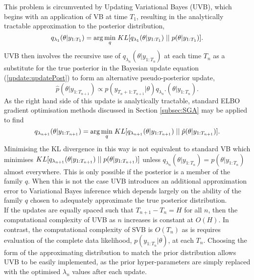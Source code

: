 \documentclass[12pt,a4paper]{article}\usepackage[]{graphicx}\usepackage[]{color}
\begin{document}
This problem is circumvented by Updating Variational Bayes (UVB), which begins with an application of VB at time $T_1$, resulting in the analytically tractable approximation to the posterior distribution,
\begin{equation}
\label{UVB:Time1}
q_{\lambda_1}(\theta | y_{1:T_1}) = \arg \underset{q}{\min} \hspace{1mm} KL[q_{\lambda_1} (\theta | y_{1:T_1}) \hspace{.1cm}||\hspace{.1cm}p(\theta | y_{1:T_1})].
\end{equation}
UVB then involves the recursive use of $q_{\lambda_n}(\theta | y_{1:T_n})$ at each time $T_n$ as a substitute for the true posterior in the Bayesian update equation (\ref{update:updatePost}) to form an alternative pseudo-posterior update,
\begin{equation}
\label{UVB:pHatPosterior}
\hat{p}(\theta |  y_{1:T_{n+1}}) \propto p(y_{T_{n}+1:T_{n+1}} | \theta)q_{\lambda_{n}}.(\theta | y_{1:T_{n}}).
\end{equation}
As the right hand side of this update is analytically tractable, standard ELBO gradient optimisation methods discussed in Section \ref{subsec:SGA} may be applied to find  
\begin{equation}
\label{UVB:TimeNp1}
q_{\lambda_{n+1}}(\theta | y_{1:T_{n+1}}) = \arg \underset{q}{\min} \hspace{1mm} KL[q_{\lambda_{n+1}} (\theta | y_{1:T_{n+1}}) \hspace{.1cm}||\hspace{.1cm}\hat{p}(\theta | y_{1:T_{n+1}})].
\end{equation}
Minimising the KL divergence in this way is not equivalent to standard VB which minimises $KL[q_{\lambda_{n+1}} (\theta | y_{1:T_{n+1}}) \hspace{.1cm}||\hspace{.1cm}p(\theta | y_{1:T_{n+1}})]$ unless $q_{\lambda_{n}}(\theta |  y_{1:T_{n}}) = p(\theta |  y_{1:T_{n}})$ almost everywhere. This is only possible if the posterior is a member of the family $q$. When this is not the case UVB introduces an additional approximation error to Variational Bayes inference which depends largely on the ability of the family $q$ chosen to adequately approximate the true posterior distribution.
\\

If the updates are equally spaced such that $T_{n+1} - T_{n} = H$ for all $n$, then the computational complexity of UVB as $n$ increases is constant at $O(H)$. In contrast, the computational complexity of SVB is $O(T_{n})$ as is requires evaluation of the complete data likelihood, $p(y_{1:T_{n}} | \theta)$, at each $T_{n}$. Choosing the form of the approximating distribution to match the prior distribution allows UVB to be easily implemented, as the prior hyper-parameters are simply replaced with the optimised $\lambda_n$ values after each update.
\\
\end{document}
